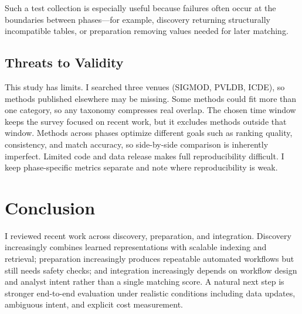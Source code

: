 \documentclass[sigconf]{acmart}
\begin{document}
Such a test collection is especially useful because failures often occur at the boundaries between phases---for example, discovery returning structurally incompatible tables, or preparation removing values needed for later matching.

\subsection{Threats to Validity}
This study has limits. I searched three venues (SIGMOD, PVLDB, ICDE), so methods published elsewhere may be missing. Some methods could fit more than one category, so any taxonomy compresses real overlap. The chosen time window keeps the survey focused on recent work, but it excludes methods outside that window. Methods across phases optimize different goals such as ranking quality, consistency, and match accuracy, so side-by-side comparison is inherently imperfect. Limited code and data release makes full reproducibility difficult. I keep phase-specific metrics separate and note where reproducibility is weak.

\section{Conclusion}
I reviewed recent work across discovery, preparation, and integration. Discovery increasingly combines learned representations with scalable indexing and retrieval; preparation increasingly produces repeatable automated workflows but still needs safety checks; and integration increasingly depends on workflow design and analyst intent rather than a single matching score. A natural next step is stronger end-to-end evaluation under realistic conditions including data updates, ambiguous intent, and explicit cost measurement.


\balance


\end{document}
